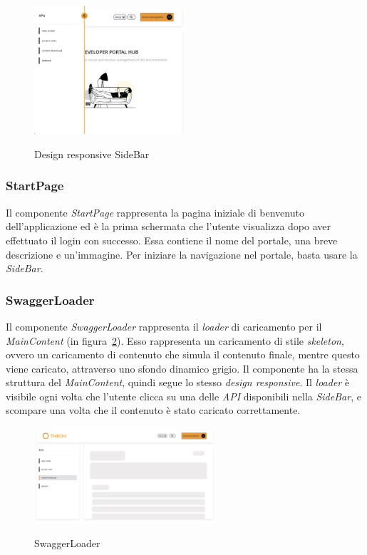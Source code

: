 \begin{figure}[ht]
  \centering
  \includegraphics[width=0.5\textwidth, alt={Design responsive della barra laterale}]{images/frontend/Sidebar.jpg}
  \caption{Design responsive SideBar}\label{fig:side-bar-responsive}
\end{figure}

\subsubsection{StartPage}\label{subsubsec:start-page}
Il componente \textit{StartPage} rappresenta la pagina iniziale di benvenuto dell'applicazione ed è la prima schermata che l'utente visualizza dopo aver effettuato il login con successo.
Essa contiene il nome del portale, una breve descrizione e un'immagine. Per iniziare la navigazione nel portale, basta usare la \textit{SideBar}.

\subsubsection{SwaggerLoader}\label{subsubsec:swagger-loader}
Il componente \textit{SwaggerLoader} rappresenta il \textit{loader} di caricamento per il \textit{MainContent} (in figura~\ref{fig:swagger-loader}). 
Esso rappresenta un caricamento di stile \textit{skeleton}, ovvero un caricamento di contenuto che simula il contenuto finale, mentre questo viene caricato, attraverso uno sfondo dinamico grigio.
Il componente ha la stessa struttura del \textit{MainContent}, quindi segue lo stesso \textit{design responsive}.
Il \textit{loader} è visibile ogni volta che l'utente clicca su una delle \textit{API} disponibili nella \textit{SideBar}, e scompare una volta che il contenuto è stato caricato correttamente.

\begin{figure}[ht]
  \centering
  \includegraphics[width=0.6\textwidth, alt={Skeleton loader di caricamento per contenuto principale}]{images/frontend/SwaggerLoader.jpg}
  \caption{SwaggerLoader}\label{fig:swagger-loader}
\end{figure}

